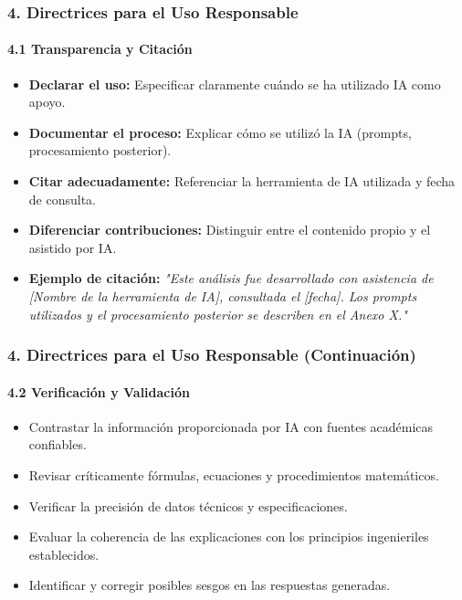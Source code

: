 \documentclass{beamer}
\begin{document}
	\begin{frame}
		\frametitle{4. Directrices para el Uso Responsable}
		\framesubtitle{4.1 Transparencia y Citación}
		\begin{itemize}
			\item \textbf{Declarar el uso:} Especificar claramente cuándo se ha utilizado IA como apoyo.
			\item \textbf{Documentar el proceso:} Explicar cómo se utilizó la IA (prompts, procesamiento posterior).
			\item \textbf{Citar adecuadamente:} Referenciar la herramienta de IA utilizada y fecha de consulta.
			\item \textbf{Diferenciar contribuciones:} Distinguir entre el contenido propio y el asistido por IA.
			\item \textbf{Ejemplo de citación:} \textit{"Este análisis fue desarrollado con asistencia de [Nombre de la herramienta de IA], consultada el [fecha]. Los prompts utilizados y el procesamiento posterior se describen en el Anexo X."}
		\end{itemize}
	\end{frame}
	
	\begin{frame}
		\frametitle{4. Directrices para el Uso Responsable (Continuación)}
		\framesubtitle{4.2 Verificación y Validación}
		\begin{itemize}
			\item Contrastar la información proporcionada por IA con fuentes académicas confiables.
			\item Revisar críticamente fórmulas, ecuaciones y procedimientos matemáticos.
			\item Verificar la precisión de datos técnicos y especificaciones.
			\item Evaluar la coherencia de las explicaciones con los principios ingenieriles establecidos.
			\item Identificar y corregir posibles sesgos en las respuestas generadas.
		\end{itemize}
	\end{frame}
	
\end{document}
